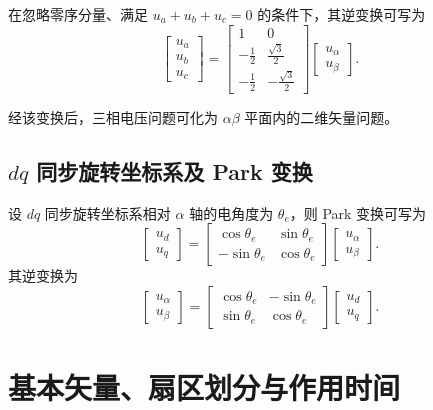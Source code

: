 \documentclass[a4paper, 12pt]{ctexart}
\begin{document}
在忽略零序分量、满足 $u_a + u_b + u_c = 0$ 的条件下，其逆变换可写为
\[
  \begin{bmatrix}
    u_a \\ u_b \\ u_c
  \end{bmatrix}
  =
  \begin{bmatrix}
    1            & 0                   \\
    -\frac{1}{2} & \frac{\sqrt{3}}{2}  \\
    -\frac{1}{2} & -\frac{\sqrt{3}}{2}
  \end{bmatrix}
  \begin{bmatrix}
    u_\alpha \\ u_\beta
  \end{bmatrix}.
\]

经该变换后，三相电压问题可化为 $\alpha\beta$ 平面内的二维矢量问题。

\subsection{\texorpdfstring{$dq$}{dq} 同步旋转坐标系及 Park 变换}

设 $dq$ 同步旋转坐标系相对 $\alpha$ 轴的电角度为 $\theta_e$，则 Park 变换可写为
\[
  \begin{bmatrix}
    u_d \\ u_q
  \end{bmatrix}
  =
  \begin{bmatrix}
    \cos\theta_e  & \sin\theta_e \\
    -\sin\theta_e & \cos\theta_e
  \end{bmatrix}
  \begin{bmatrix}
    u_\alpha \\ u_\beta
  \end{bmatrix}.
\]
其逆变换为
\[
  \begin{bmatrix}
    u_\alpha \\ u_\beta
  \end{bmatrix}
  =
  \begin{bmatrix}
    \cos\theta_e & -\sin\theta_e \\
    \sin\theta_e & \cos\theta_e
  \end{bmatrix}
  \begin{bmatrix}
    u_d \\ u_q
  \end{bmatrix}.
\]

\section{基本矢量、扇区划分与作用时间}
\end{document}
